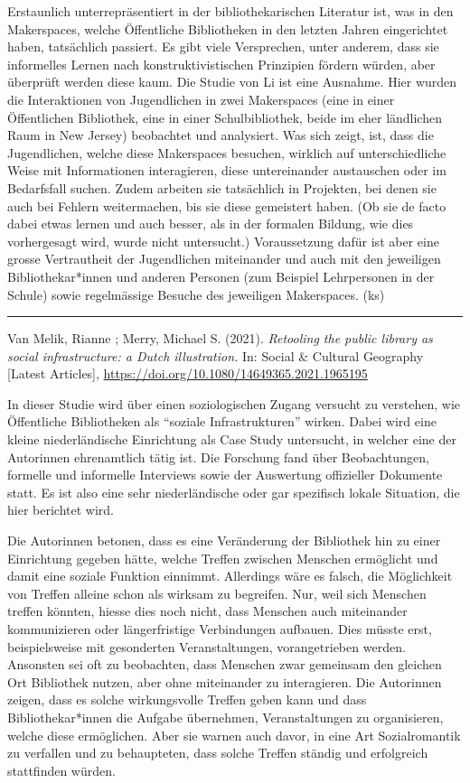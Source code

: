 \documentclass[a4paper,
fontsize=11pt,
oneside,
numbers=noperiodatend,
parskip=half-,
bibliography=totoc,
final
]{scrartcl}
\begin{document}
Erstaunlich unterrepräsentiert in der bibliothekarischen Literatur ist,
was in den Makerspaces, welche Öffentliche Bibliotheken in den letzten
Jahren eingerichtet haben, tatsächlich passiert. Es gibt viele
Versprechen, unter anderem, dass sie informelles Lernen nach
konstruktivistischen Prinzipien fördern würden, aber überprüft werden
diese kaum. Die Studie von Li ist eine Ausnahme. Hier wurden die
Interaktionen von Jugendlichen in zwei Makerspaces (eine in einer
Öffentlichen Bibliothek, eine in einer Schulbibliothek, beide im eher
ländlichen Raum in New Jersey) beobachtet und analysiert. Was sich
zeigt, ist, dass die Jugendlichen, welche diese Makerspaces besuchen,
wirklich auf unterschiedliche Weise mit Informationen interagieren,
diese untereinander austauschen oder im Bedarfsfall suchen. Zudem
arbeiten sie tatsächlich in Projekten, bei denen sie auch bei Fehlern
weitermachen, bis sie diese gemeistert haben. (Ob sie de facto dabei
etwas lernen und auch besser, als in der formalen Bildung, wie dies
vorhergesagt wird, wurde nicht untersucht.) Voraussetzung dafür ist aber
eine grosse Vertrautheit der Jugendlichen miteinander und auch mit den
jeweiligen Bibliothekar*innen und anderen Personen (zum Beispiel
Lehrpersonen in der Schule) sowie regelmässige Besuche des jeweiligen
Makerspaces. (ks)

\begin{center}\rule{0.5\linewidth}{0.5pt}\end{center}

Van Melik, Rianne ; Merry, Michael S. (2021). \emph{Retooling the public
library as social infrastructure: a Dutch illustration.} In: Social \&
Cultural Geography {[}Latest Articles{]},
\url{https://doi.org/10.1080/14649365.2021.1965195}

In dieser Studie wird über einen soziologischen Zugang versucht zu
verstehen, wie Öffentliche Bibliotheken als \enquote{soziale
Infrastrukturen} wirken. Dabei wird eine kleine niederländische
Einrichtung als Case Study untersucht, in welcher eine der Autorinnen
ehrenamtlich tätig ist. Die Forschung fand über Beobachtungen, formelle
und informelle Interviews sowie der Auswertung offizieller Dokumente
statt. Es ist also eine sehr niederländische oder gar spezifisch lokale
Situation, die hier berichtet wird.

Die Autorinnen betonen, dass es eine Veränderung der Bibliothek hin zu
einer Einrichtung gegeben hätte, welche Treffen zwischen Menschen
ermöglicht und damit eine soziale Funktion einnimmt. Allerdings wäre es
falsch, die Möglichkeit von Treffen alleine schon als wirksam zu
begreifen. Nur, weil sich Menschen treffen könnten, hiesse dies noch
nicht, dass Menschen auch miteinander kommunizieren oder längerfristige
Verbindungen aufbauen. Dies müsste erst, beispielsweise mit gesonderten
Veranstaltungen, vorangetrieben werden. Ansonsten sei oft zu beobachten,
dass Menschen zwar gemeinsam den gleichen Ort Bibliothek nutzen, aber
ohne miteinander zu interagieren. Die Autorinnen zeigen, dass es solche
wirkungsvolle Treffen geben kann und dass Bibliothekar*innen die Aufgabe
übernehmen, Veranstaltungen zu organisieren, welche diese ermöglichen.
Aber sie warnen auch davor, in eine Art Sozialromantik zu verfallen und
zu behaupteten, dass solche Treffen ständig und erfolgreich stattfinden
würden.
\end{document}
